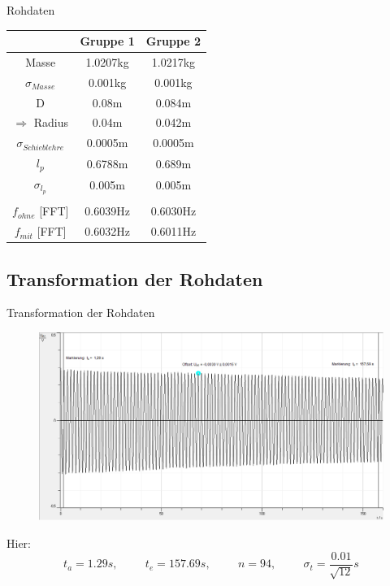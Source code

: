 \documentclass[11pt]{beamer}
\begin{document}
\begin{frame}{Rohdaten}
\begin{multicols}{2}
\begin{figure}[H]
\end{figure}
\columnbreak
\begin{center}
\begin{tabular}{c|c|c}
 & Gruppe 1 & Gruppe 2 \\ 
\hline
Masse & 1.0207kg & 1.0217kg \\ 
$\sigma_{Masse}$ & 0.001kg & 0.001kg \\ 
D & 0.08m & 0.084m \\ 
$\Rightarrow$ Radius & 0.04m & 0.042m \\ 
$\sigma_{Schieblehre}$ & 0.0005m & 0.0005m \\ 
$l_p$ & 0.6788m & 0.689m \\ 
$\sigma_{l_p}$ & 0.005m & 0.005m \\ 
\hline
 & &  \\
$f_{ohne}$ [FFT] & 0.6039Hz & 0.6030Hz \\ 
$f_{mit}$ [FFT] & 0.6032Hz & 0.6011Hz \\ 
\end{tabular} 
\end{center}
\end{multicols}
\end{frame}

\subsection{Transformation der Rohdaten}
\begin{frame}{Transformation der Rohdaten}
\begin{figure}[H]
\centering
\includegraphics[scale=0.3]{Bilder/Erdbeschleunigung_bestimmungF.png}
\end{figure}
Hier:
\begin{equation*}
t_a=1.29s, \hspace{1cm} t_e=157.69s, \hspace{1cm} n=94, \hspace{1cm} \sigma_t=\frac{0.01}{\sqrt{12}}s
\end{equation*}
\end{frame}
\end{document}
